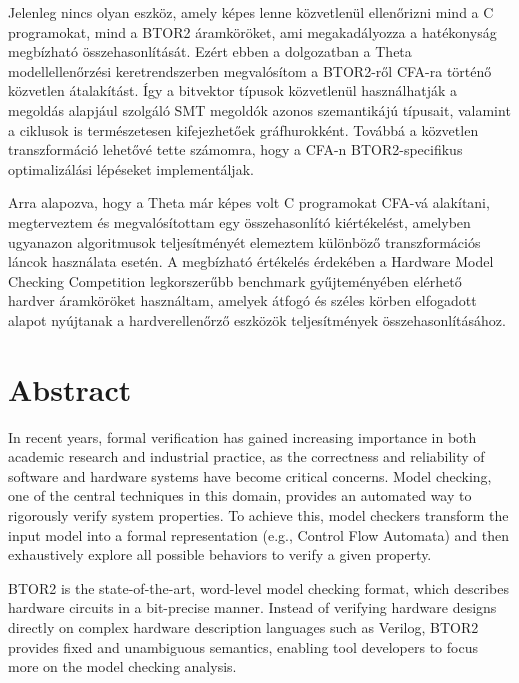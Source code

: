 Jelenleg nincs olyan eszköz, amely képes lenne közvetlenül ellenőrizni mind a C programokat, mind a BTOR2 áramköröket, ami megakadályozza a hatékonyság megbízható összehasonlítását. Ezért ebben a dolgozatban a Theta modellellenőrzési keretrendszerben megvalósítom a BTOR2-ről CFA-ra történő közvetlen átalakítást. Így a bitvektor típusok közvetlenül használhatják a megoldás alapjául szolgáló SMT megoldók azonos szemantikájú típusait, valamint a ciklusok is természetesen kifejezhetőek gráfhurokként. Továbbá a közvetlen transzformáció lehetővé tette számomra, hogy a CFA-n BTOR2-specifikus optimalizálási lépéseket implementáljak.  

Arra alapozva, hogy a Theta már képes volt C programokat CFA-vá alakítani, megterveztem és megvalósítottam egy összehasonlító kiértékelést, amelyben ugyanazon algoritmusok teljesítményét elemeztem különböző transzformációs láncok használata esetén. A megbízható értékelés érdekében a Hardware Model Checking Competition legkorszerűbb benchmark gyűjteményében elérhető hardver áramköröket használtam, amelyek átfogó és széles körben elfogadott alapot nyújtanak a hardverellenőrző eszközök teljesítmények összehasonlításához.  

\vfill
\selectenglish


\chapter*{Abstract}

In recent years, formal verification has gained increasing importance in both academic research and industrial practice, as the correctness and reliability of software and hardware systems have become critical concerns. Model checking, one of the central techniques in this domain, provides an automated way to rigorously verify system properties. To achieve this, model checkers transform the input model into a formal representation (e.g., Control Flow Automata) and then exhaustively explore all possible behaviors to verify a given property.  

BTOR2 is the state-of-the-art, word-level model checking format, which describes hardware circuits in a bit-precise manner. Instead of verifying hardware designs directly on complex hardware description languages such as Verilog, BTOR2 provides fixed and unambiguous semantics, enabling tool developers to focus more on the model checking analysis.  

